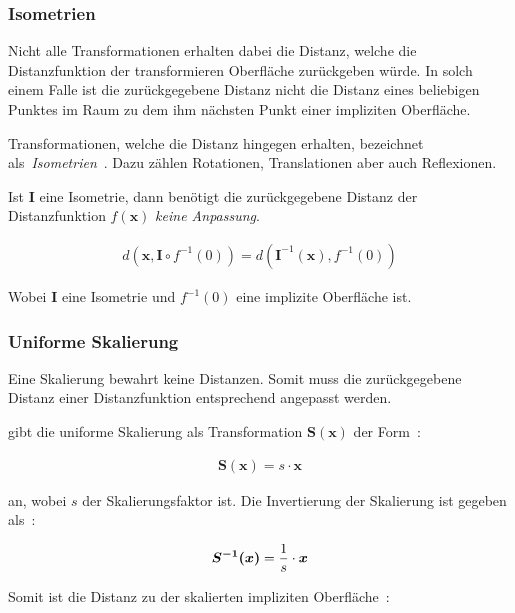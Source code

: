 \subsubsection{Isometrien}
\label{ssubsec:implicit_surfaces_ops_isometries}

Nicht alle Transformationen erhalten dabei die Distanz, welche die
Distanzfunktion der transformieren Oberfläche zurückgeben würde. In
solch einem Falle ist die zurückgegebene Distanz nicht die Distanz eines
beliebigen Punktes im Raum zu dem ihm nächsten Punkt einer impliziten
Oberfläche.

Transformationen, welche die Distanz hingegen erhalten,
bezeichnet~\citeauthor{hart_sphere_1994}
als~\textit{Isometrien}~\parencite[S. 534]{hart_sphere_1994}. Dazu
zählen Rotationen, Translationen aber auch Reflexionen.

Ist $\bm{I}$ eine Isometrie, dann benötigt die zurückgegebene Distanz der
Distanzfunktion $f(\bm{x})$ \textit{keine Anpassung}.

\begin{gather}
    d(\bm{x}, \bm{I} \circ f^{-1}(0)) = d(\bm{I}^{-1}(\bm{x}), f^{-1}(0))
\end{gather}

Wobei $\bm{I}$ eine Isometrie und $f^{-1}(0)$ eine implizite Oberfläche ist.

\subsubsection{Uniforme Skalierung}
\label{ssubsec:implicit_surfaces_ops_scaling}

Eine Skalierung bewahrt keine Distanzen. Somit muss die zurückgegebene
Distanz einer Distanzfunktion entsprechend angepasst werden.

\citeauthor{hart_sphere_1994} gibt die uniforme Skalierung als
Transformation $\bm{S(x)}$  der Form~\parencite[S. 534]{hart_sphere_1994}:

\begin{gather}
    \bm{S(x)} = s \cdot \bm{x}
\end{gather}

an, wobei $s$ der Skalierungsfaktor ist. Die Invertierung der Skalierung
ist gegeben als~\parencite[S. 534]{hart_sphere_1994}:

\begin{gather}
    \bm{S^{-1}(x)} = {1 \over s} \cdot \bm{x}
\end{gather}

Somit ist die Distanz zu der skalierten impliziten
Oberfläche~\parencite[S. 534]{hart_sphere_1994}:

